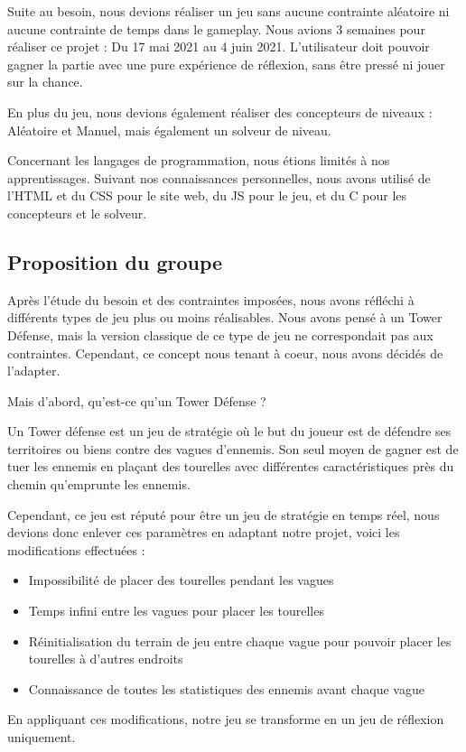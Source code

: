 \documentclass{article}
\begin{document}
Suite au besoin, nous devions réaliser un jeu sans aucune contrainte aléatoire ni aucune contrainte de temps dans le gameplay. Nous avions 3 semaines pour réaliser ce projet : Du 17 mai 2021 au 4 juin 2021.
L'utilisateur doit pouvoir gagner la partie avec une pure expérience de réflexion, sans être pressé ni jouer sur la chance.\newline

En plus du jeu, nous devions également réaliser des concepteurs de niveaux : Aléatoire et Manuel, mais également un solveur de niveau.\newline

Concernant les langages de programmation, nous étions limités à nos apprentissages. Suivant nos connaissances personnelles, nous avons utilisé de l'HTML et du CSS pour le site web, du JS pour le jeu, et du C pour les concepteurs et le solveur.\newline

\subsection{Proposition du groupe}

Après l'étude du besoin et des contraintes imposées, nous avons réfléchi à différents types de jeu plus ou moins réalisables. Nous avons pensé à un Tower Défense, mais la version classique de ce type de jeu ne correspondait pas aux contraintes. Cependant, ce concept nous tenant à coeur, nous avons décidés de l'adapter.\newline

Mais d'abord, qu'est-ce qu'un Tower Défense ?\newline

Un Tower défense est un jeu de stratégie où le but du joueur est de défendre ses territoires ou biens contre des vagues d'ennemis. Son seul moyen de gagner est de tuer les ennemis en plaçant des tourelles avec différentes caractéristiques près du chemin qu'emprunte les ennemis.\newline

Cependant, ce jeu est réputé pour être un jeu de stratégie en temps réel, nous devions donc enlever ces paramètres en adaptant notre projet, voici les modifications effectuées :
\begin{itemize}
    \item Impossibilité de placer des tourelles pendant les vagues
    \item Temps infini entre les vagues pour placer les tourelles
    \item Réinitialisation du terrain de jeu entre chaque vague pour pouvoir placer les tourelles à d'autres endroits
    \item Connaissance de toutes les statistiques des ennemis avant chaque vague\newline
\end{itemize}

En appliquant ces modifications, notre jeu se transforme en un jeu de réflexion uniquement.\newline
\end{document}

